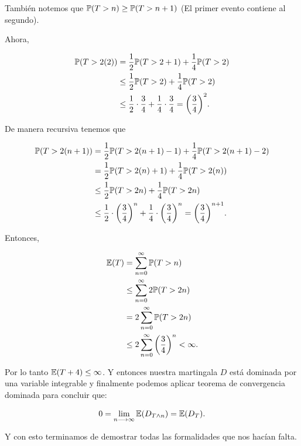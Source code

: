 	También notemos que $\mathbb{P}(T > n ) \geq \mathbb{P}(T > n + 1)$ (El primer evento contiene al segundo).\par\null
	
	Ahora,
    
	\begin{align}
		\mathbb{P}(T > 2 (2)) &=     \frac{1}{2} \mathbb{P}(T > 2+1) + \frac{1}{4} \mathbb{P}(T > 2) \\
					   &\leq  \frac{1}{2} \mathbb{P}(T > 2) + \frac{1}{4} \mathbb{P}(T > 2) \\
					   &\leq  \frac{1}{2} \cdot \frac{3}{4} + \frac{1}{4} \cdot \frac{3}{4} = \bigg(\frac{3}{4}\bigg)^2.
	\end{align}\par\null
	
	De manera recursiva tenemos que
	
    \begin{align}
		\mathbb{P}(T > 2(n+1)) &=     \frac{1}{2} \mathbb{P}(T > 2(n+1) - 1) + \frac{1}{4} \mathbb{P}(T > 2(n+1) - 2) \\
						&=     \frac{1}{2} \mathbb{P}(T > 2(n) + 1) + \frac{1}{4} \mathbb{P}(T > 2(n)) \\
					   &\leq  \frac{1}{2} \mathbb{P}(T > 2n) + \frac{1}{4} \mathbb{P}(T > 2n) \\
					   &\leq  \frac{1}{2} \cdot \bigg(\frac{3}{4}\bigg)^{n} + \frac{1}{4} \cdot \bigg(\frac{3}{4}\bigg)^{n} = 		
					   \bigg(\frac{3}{4}\bigg)^{n+1}.
	\end{align}\par\null
	
	Entonces,
	
    \begin{align}
		\mathbb{E}(T) 	&= 		\sum_{n=0}^\infty \mathbb{P}(T > n) \\
				&\leq 	\sum_{n=0}^\infty 2\mathbb{P}(T > 2n) \\
				&= 		2 \sum_{n=0}^\infty \mathbb{P}(T > 2n) \\
				&\leq 	2 \sum_{n=0}^\infty \bigg(\frac{3}{4}\bigg)^{n} < \infty.
	\end{align}\par\null
	
	Por lo tanto $\mathbb{E}(T + 4) \leq \infty$. Y entonces nuestra martingala $D$ está dominada por una variable integrable y finalmente
	podemos aplicar teorema de convergencia dominada para concluir que:
	
    \begin{align}
		0 = \lim_{n \longrightarrow \infty} \mathbb{E}(D_{T \wedge n}) = \mathbb{E}(D_T).
	\end{align}\par\null
	
	Y con esto terminamos de demostrar todas las formalidades que nos hacían falta.